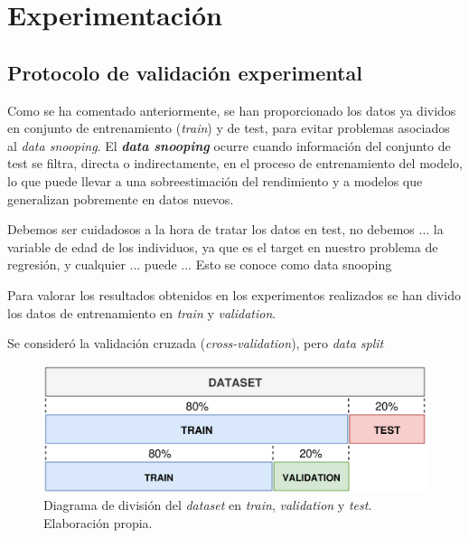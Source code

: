 \chapter{Experimentación}


\section{Protocolo de validación experimental}

Como se ha comentado anteriormente, se han proporcionado los datos ya dividos en conjunto de entrenamiento
(\textit{train}) y de test, para evitar problemas asociados al \textit{data snooping}. El 
\textbf{\textit{data snooping}} ocurre cuando información del conjunto de test se filtra, directa o 
indirectamente, en el proceso de entrenamiento del modelo, lo que puede llevar a una sobreestimación del 
rendimiento y a modelos que generalizan pobremente en datos nuevos.




Debemos ser cuidadosos a la hora de tratar los datos en test, no debemos ... la variable de edad de los 
individuos, ya que es el target en nuestro problema de regresión, y cualquier ... puede ... Esto se conoce
como data snooping





Para valorar los resultados obtenidos en los experimentos realizados se han divido los datos de 
entrenamiento en \textit{train} y \textit{validation}. 

Se consideró la validación cruzada (\textit{cross-validation}), pero 
\textit{data split}


\begin{figure}[h]
    \centering
    \includegraphics[width=\textwidth]{capitulos/cap_04/imagenes/data_split_base.png}
    \caption[
        Diagrama de división del \textit{dataset} en \textit{train}, \textit{validation} y \textit{test}.
    ]{
        Diagrama de división del \textit{dataset} en \textit{train}, \textit{validation} y \textit{test}. 
        Elaboración propia.
    } 
    \label{fig:data_split_base}
\end{figure}

